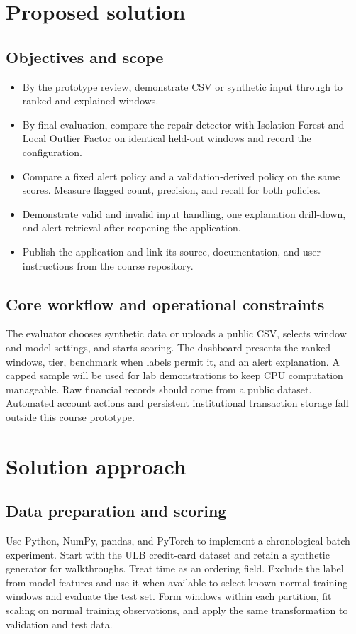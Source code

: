 \documentclass[11pt,a4paper]{article}
\begin{document}
\section{Proposed solution}
\subsection{Objectives and scope}
\renewcommand{\labelitemi}{\(\bullet\)}
\begin{itemize}
\item By the prototype review, demonstrate CSV or synthetic input through to ranked and explained windows.
\item By final evaluation, compare the repair detector with Isolation Forest and Local Outlier Factor on identical held-out windows and record the configuration.
\item Compare a fixed alert policy and a validation-derived policy on the same scores. Measure flagged count, precision, and recall for both policies.
\item Demonstrate valid and invalid input handling, one explanation drill-down, and alert retrieval after reopening the application.
\item Publish the application and link its source, documentation, and user instructions from the course repository.
\end{itemize}

\subsection{Core workflow and operational constraints}
The evaluator chooses synthetic data or uploads a public CSV, selects window and model settings, and starts scoring. The dashboard presents the ranked windows, tier, benchmark when labels permit it, and an alert explanation. A capped sample will be used for lab demonstrations to keep CPU computation manageable. Raw financial records should come from a public dataset. Automated account actions and persistent institutional transaction storage fall outside this course prototype.

\section{Solution approach}
\subsection{Data preparation and scoring}
Use Python, NumPy, pandas, and PyTorch to implement a chronological batch experiment. Start with the ULB credit-card dataset and retain a synthetic generator for walkthroughs. Treat time as an ordering field. Exclude the label from model features and use it when available to select known-normal training windows and evaluate the test set. Form windows within each partition, fit scaling on normal training observations, and apply the same transformation to validation and test data.
\end{document}
